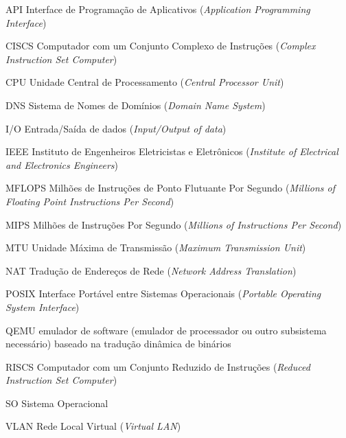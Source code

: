 \begin{siglas}
    \item[API] Interface de Programação de Aplicativos (\textit{Application  Programming  Interface})
     \item[CISCS] Computador com um Conjunto Complexo de Instruções (\textit{Complex Instruction Set Computer})
    \item[CPU] Unidade Central de Processamento (\textit{Central Processor Unit}) 
    \item[DNS] Sistema de Nomes de Domínios (\textit{Domain Name System})
    \item[I/O] Entrada/Saída de dados (\textit{Input/Output of data})
    \item[IEEE] Instituto de Engenheiros Eletricistas e Eletrônicos (\textit{Institute of Electrical and Electronics Engineers})
    \item[MFLOPS] Milhões de Instruções de Ponto Flutuante Por Segundo (\textit{Millions of Floating Point Instructions Per Second})
     \item[MIPS] Milhões de Instruções Por Segundo (\textit{Millions of Instructions Per Second})
     \item[MTU] Unidade Máxima de Transmissão (\textit{Maximum Transmission Unit})
  \item[NAT] Tradução de Endereços de Rede (\textit{Network Address Translation})
    \item[POSIX] Interface Portável entre Sistemas Operacionais (\textit{Portable Operating System Interface})
     \item[QEMU] emulador de software (emulador de processador ou outro subsistema necessário) baseado na tradução dinâmica de binários
     \item[RISCS] Computador com um Conjunto Reduzido de Instruções (\textit{Reduced Instruction Set Computer})
     \item[SO] Sistema Operacional
  \item[VLAN] Rede Local Virtual (\textit{Virtual LAN})
\end{siglas}